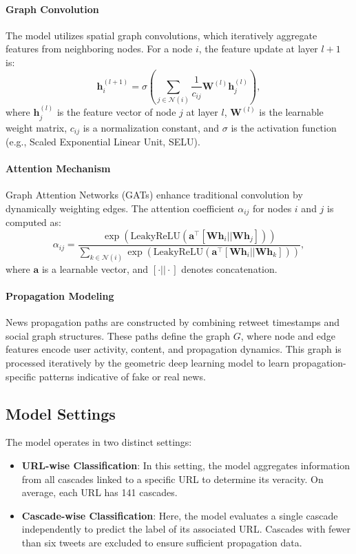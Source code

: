\documentclass[sigconf,nonacm]{acmart}
\begin{document}
\paragraph{Graph Convolution}
The model utilizes spatial graph convolutions, which iteratively aggregate features from neighboring nodes. For a node \( i \), the feature update at layer \( l+1 \) is:
\[
\bm{h}_i^{(l+1)} = \sigma \left( \sum_{j \in \mathcal{N}(i)} \frac{1}{c_{ij}} \bm{W}^{(l)} \bm{h}_j^{(l)} \right),
\]
where \( \bm{h}_j^{(l)} \) is the feature vector of node \( j \) at layer \( l \), \( \bm{W}^{(l)} \) is the learnable weight matrix, \( c_{ij} \) is a normalization constant, and \( \sigma \) is the activation function (e.g., Scaled Exponential Linear Unit, SELU).

\paragraph{Attention Mechanism}
Graph Attention Networks (GATs) enhance traditional convolution by dynamically weighting edges. The attention coefficient \( \alpha_{ij} \) for nodes \( i \) and \( j \) is computed as:
\[
\alpha_{ij} = \frac{\exp(\text{LeakyReLU}(\bm{a}^\top [\bm{W} \bm{h}_i || \bm{W} \bm{h}_j]))}{\sum_{k \in \mathcal{N}(i)} \exp(\text{LeakyReLU}(\bm{a}^\top [\bm{W} \bm{h}_i || \bm{W} \bm{h}_k]))},
\]
where \( \bm{a} \) is a learnable vector, and \( [\cdot || \cdot] \) denotes concatenation.

\paragraph{Propagation Modeling}
News propagation paths are constructed by combining retweet timestamps and social graph structures. These paths define the graph \( G \), where node and edge features encode user activity, content, and propagation dynamics. This graph is processed iteratively by the geometric deep learning model to learn propagation-specific patterns indicative of fake or real news.


\subsection{Model Settings}

The model operates in two distinct settings:
\begin{itemize}
    \item \textbf{URL-wise Classification}: In this setting, the model aggregates information from all cascades linked to a specific URL to determine its veracity. On average, each URL has 141 cascades.
    \item \textbf{Cascade-wise Classification}: Here, the model evaluates a single cascade independently to predict the label of its associated URL. Cascades with fewer than six tweets are excluded to ensure sufficient propagation data.
\end{itemize}
\end{document}
